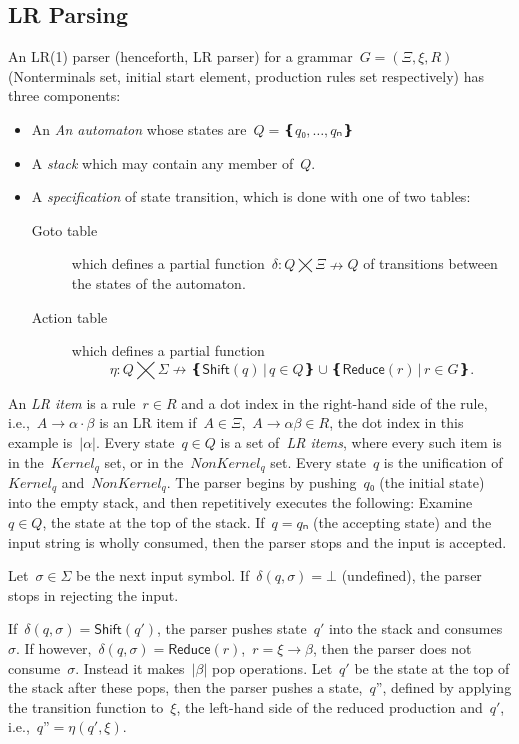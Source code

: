 \subsection{LR Parsing}
An LR(1) parser (henceforth, LR parser) for a grammar~$G=(Ξ,ξ,R)$
  (Nonterminals set, initial start element, production rules set respectively)
  has three components:
\begin{itemize}
  \item An \emph{An automaton} whose states are~$Q=❴q₀,…,qₙ❵$
  \item A \emph{stack} which may contain any member of~$Q$.
\item A \emph{specification} of state transition, 
    which is done with one of two tables:
  \begin{description}
    \item[Goto table] which defines a partial function~$δ:Q⨉Ξ↛Q$ of transitions
    between the states of the automaton.
    \item[Action table] which
    defines a partial function\[η:Q⨉Σ↛ ❴ \textsf{Shift}(q) \,|\, q∈Q❵ ∪ ❴\textsf{Reduce}(r) \,| \, r∈G❵.\]
  \end{description}
\end{itemize}
An \emph{LR item} is a rule~$r∈R$ and a dot index in the right-hand side of the rule,
  i.e.,~$A→α·β$ is an LR item if~$A∈Ξ$,~$A→αβ∈R$,
  the dot index in this example is~$|α|$.
Every state~$q∈Q$ is a set of~\emph{LR items},
  where every such item is in the~$Kernel_{q}$ set,
  or in the~$NonKernel_{q}$ set.
Every state~$q$ is the unification of~$Kernel_{q}$ and~$NonKernel_{q}$.
The parser begins by pushing~$q₀$ (the initial state) into the empty stack,
and then repetitively executes the following:
Examine~$q∈Q$, the state at the top of the stack.
If~$q=qₙ$ (the accepting state) and the input string is wholly consumed, then the parser stops and the input is accepted.

Let~$σ∈Σ$ be the next input symbol.
If~$δ(q,σ)=⊥$ (undefined), the parser stops in rejecting the input.

If~$δ(q,σ) = \textsf{Shift}(q')$, the parser pushes state~$q'$
into the stack and consumes~$σ$.
If however,~$δ(q,σ) = \textsf{Reduce}(r)$,~$r=ξ→β$,
then the parser does not consume~$σ$.
Instead it makes~$|β|$ pop operations.
Let~$q'$ be the state at the top of the stack after these pops, then
the parser pushes a state,~$q”$,
defined by applying the transition function to~$ξ$, the left-hand side of the reduced production and~$q'$,
i.e.,~$q”=η(q',ξ)$.

